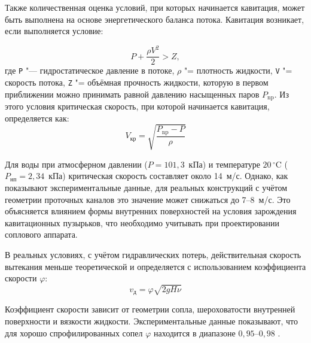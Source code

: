 Также количественная оценка условий, при которых начинается кавитация, может быть 
выполнена на основе энергетического баланса потока. Кавитация возникает, если 
выполняется условие:

\begin{equation*}
    P + \frac{\rho V^2}{2} > Z,
\end{equation*}
где \texttt{P} "--- гидростатическое давление в потоке, \texttt{$\rho$} "= плотность жидкости, \texttt{V} "= скорость потока, \texttt{Z} "=
объёмная прочность жидкости, которую в первом приближении можно принимать равной
давлению насыщенных паров $P_{\text{np}}$. Из этого условия критическая скорость, при которой
начинается кавитация, определяется как:
\begin{equation*}
    V_{\text{кр}} = \sqrt{\frac{P_{\text{np}} - P}{\rho}}
\end{equation*}

Для воды при атмосферном давлении ($P = 101{,}3$~кПа) и температуре $20\,^{\circ}\text{C}$ 
($P_{\text{нп}} = 2{,}34$~кПа) критическая скорость составляет около 14~м/с. Однако, 
как показывают экспериментальные данные, для реальных конструкций с учётом геометрии 
проточных каналов это значение может снижаться до 7--8~м/с. Это объясняется влиянием 
формы внутренних поверхностей на условия зарождения кавитационных пузырьков, что 
необходимо учитывать при проектировании соплового аппарата.



В реальных условиях, с учётом гидравлических потерь, действительная скорость
вытекания меньше теоретической и определяется с использованием коэффициента скорости 
$\varphi$:
\begin{equation*}
    v_{\text{д}} = \varphi \sqrt{2gH\nu}
\end{equation*}

Коэффициент скорости зависит от геометрии сопла, шероховатости внутренней
поверхности и вязкости жидкости. Экспериментальные данные показывают, что для 
хорошо спрофилированных сопел $\varphi$ находится в диапазоне $0{,}95$--$0{,}98$ \cite{bozarov2024a}.

